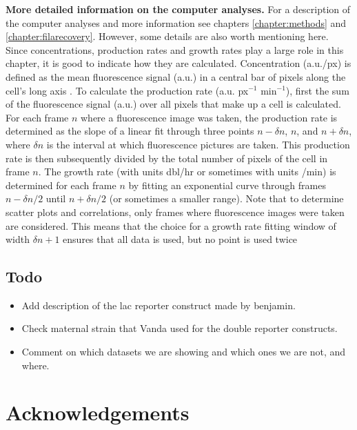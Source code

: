 \textbf{More detailed information on the computer analyses.} 
For a description of the computer analyses and more information see chapters \ref{chapter:methods} and \ref{chapter:filarecovery}.
However, some details are also worth mentioning here. 
Since concentrations, production rates and growth rates play a large role in this chapter, it is good to indicate how they are calculated.
Concentration (a.u./px) is defined as the mean fluorescence signal (a.u.) in a central bar of pixels along the cell's long axis \cite{Kiviet2010}.
%
To calculate the production rate (a.u. px$^{-1}$ min$^{-1}$), first the sum of the fluorescence signal (a.u.) over all pixels that make up a cell is calculated. 
For each frame $n$ where a fluorescence image was taken, the production rate is determined as the slope of a linear fit through three points $n-\delta{n}$, $n$, and $n+\delta{n}$, where $\delta{n}$ is the interval at which fluorescence pictures are taken. This production rate is then subsequently divided by the total number of pixels of the cell in frame $n$.
The growth rate (with units dbl/hr or sometimes with units /min) is determined for each frame $n$ by fitting an exponential curve through frames $n-\delta{n}/2$ until $n+\delta{n}/2$ (or sometimes a smaller range).
Note that to determine scatter plots and correlations, only frames where fluorescence images were taken are considered.
This means that the choice for a growth rate fitting window of width $\delta{n}+1$ ensures that all data is used, but no point is used twice

\subsection*{Todo}

\begin{itemize}
	\item Add description of the lac reporter construct made by benjamin.
	\item Check maternal strain that Vanda used for the double reporter constructs.
	\item Comment on which datasets we are showing and which ones we are not, and where.
\end{itemize}


\section*{Acknowledgements}

